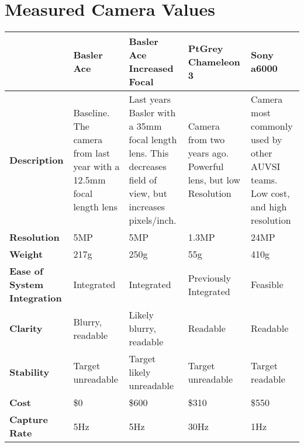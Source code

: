 \documentclass[]{auvsi_doc}
\begin{document}
\section{Measured Camera Values}
\begin{table}[H]
	\centering
	\begin{tabular}{|p{2.5cm}|p{2.9cm}|p{2.9cm}|p{2.9cm}|p{2.9cm}|}
	\hline
	\rowcolor[HTML]{C0C0C0}
& {\color[HTML]{000000} \textbf{Basler Ace}} & {\color[HTML]{000000} \textbf{Basler Ace Increased Focal}} & {\color[HTML]{000000} \textbf{PtGrey Chameleon 3}} & {\color[HTML]{000000} \textbf{Sony a6000}}\\ \hline
{\color[HTML]{000000} \textbf{Description}}	&	Baseline. The camera from last year with a 12.5mm focal length lens	&	Last years Basler with a 35mm focal length lens. This decreases field of view, but increases pixels/inch. &	Camera from two years ago. Powerful lens, but low Resolution	&	Camera most commonly used by other AUVSI teams. Low cost, and high resolution\\ \hline
{\color[HTML]{000000} \textbf{Resolution}}	&	5MP	&	5MP	&	1.3MP	&	24MP\\ \hline
{\color[HTML]{000000} \textbf{Weight}}	&	217g	&	250g	&	55g	&	410g\\ \hline
{\color[HTML]{000000} \textbf{Ease of System Integration}}	&	Integrated	&	Integrated	&	Previously Integrated	&	Feasible\\ \hline
{\color[HTML]{000000} \textbf{Clarity}}	&	Blurry, readable	&	Likely blurry, readable	&	Readable 	& Readable\\ \hline
{\color[HTML]{000000} \textbf{Stability}}	& Target unreadable	&	Target likely unreadable	&	Target unreadable	&	Target readable\\ \hline
{\color[HTML]{000000} \textbf{Cost}}	&	\$0 	&	\$600 	&	\$310	&	\$550\\ \hline
{\color[HTML]{000000} \textbf{Capture Rate}}	&	5Hz	&	5Hz	&	30Hz	&	1Hz\\ \hline
	\end{tabular}
\end{table}
\end{document}
